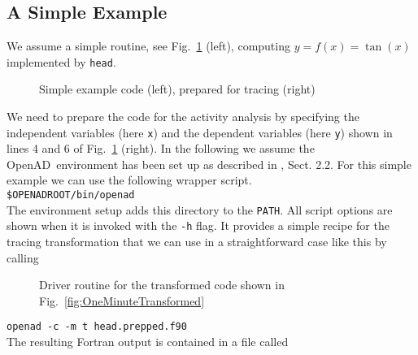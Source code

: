 \documentclass{article}
\newcommand{\openad}{OpenAD}
\newcommand{\reffig}[1]{{Fig.~\ref{#1}}}
\begin{document}
\subsection{A Simple Example}
We assume a simple routine, see \reffig{fig:OneMinute} (left), computing $y=f(x)=\tan(x)$ implemented by \lstinline{head}.
\begin{figure}
\begin{minipage}[t]{.48\linewidth}

\end{minipage}
\begin{minipage}[t]{.48\linewidth}

\end{minipage}
\caption{Simple example code (left), prepared for tracing (right)}\label{fig:OneMinute}
\end{figure}
We need to prepare the code for the activity analysis by specifying the independent variables
(here \lstinline{x}) and the dependent variables 
(here \lstinline{y}) shown in lines 4 and 6 of \reffig{fig:OneMinute} (right).
In the following we assume the \openad\ environment has been set up as 
described in \cite{userManual}, Sect. 2.2.
For this simple example we can use the following wrapper script.\\[1ex]
\hspace*{.3cm}\lstinline{$OPENADROOT/bin/openad}\\[1ex] %
The environment setup adds this directory to the \lstinline{PATH}.
All script options are shown when it is invoked with the \lstinline{-h} flag. 
It provides a simple recipe for the tracing transformation that we can use in 
a straightforward case like this by calling %
\begin{wrapfigure}[24]{r}{.5\textwidth}
\begin{minipage}{.98\linewidth}

\end{minipage}
\caption{Driver routine for the transformed code  shown in \reffig{fig:OneMinuteTransformed} }\label{fig:OneMinuteDriver}
\end{wrapfigure}
\hspace*{.3cm}\lstinline{openad -c -m t head.prepped.f90}\\[1ex]
The resulting Fortran output is contained in a file called\\[1ex]
\end{document}
